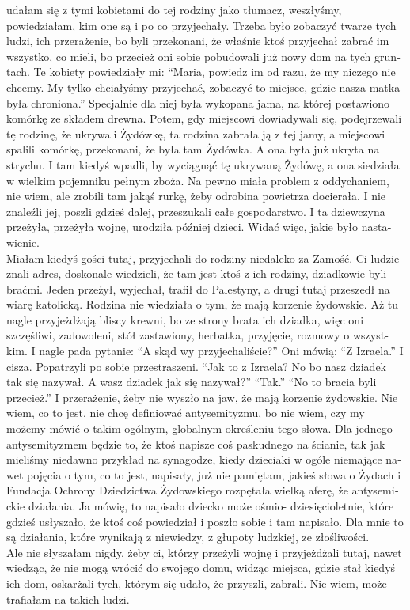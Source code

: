\begin{otherlanguage}{ngerman}
udałam się z tymi kobietami do tej rodziny jako tłumacz, weszłyśmy, powiedziałam, kim one są i po co przyjechały. Trzeba było zobaczyć twarze tych ludzi, ich przerażenie, bo byli przekonani, że właśnie ktoś przyjechał zabrać im wszystko, co mieli, bo przecież oni sobie pobudowali już nowy dom na tych gruntach. Te kobiety powiedziały mi: "`Maria, powiedz im od razu, że my niczego nie chcemy. My tylko chciałyśmy przyjechać, zobaczyć to miejsce, gdzie nasza matka była chroniona."' Specjalnie dla niej była wykopana jama, na której postawiono komórkę ze składem drewna. Potem, gdy miejscowi dowiadywali się, podejrzewali tę rodzinę, że ukrywali Żydówkę, ta rodzina zabrała ją z tej jamy, a miejscowi spalili komórkę, przekonani, że była tam Żydówka. A ona była już ukryta na strychu. I tam kiedyś wpadli, by wyciągnąć tę ukrywaną Żydówę, a ona siedziała w wielkim pojemniku pełnym zboża. Na pewno miała problem z oddychaniem, nie wiem, ale zrobili tam jakąś rurkę, żeby odrobina powietrza docierała. I nie znaleźli jej, poszli gdzieś dalej, przeszukali całe gospodarstwo. I ta dziewczyna przeżyła, przeżyła wojnę, urodziła później dzieci. Widać więc, jakie było nastawienie.\\
Miałam kiedyś gości tutaj, przyjechali do rodziny niedaleko za Zamość. Ci ludzie znali adres, doskonale wiedzieli, że tam jest ktoś z ich rodziny, dziadkowie byli braćmi. Jeden przeżył, wyjechał, trafił do Palestyny, a drugi tutaj przeszedł na wiarę katolicką. Rodzina nie wiedziała o tym, że mają korzenie żydowskie. Aż tu nagle przyjeżdżają bliscy krewni, bo ze strony brata ich dziadka, więc oni szczęśliwi, zadowoleni, stół zastawiony, herbatka, przyjęcie, rozmowy o wszystkim. I nagle pada pytanie: "`A skąd wy przyjechaliście?"' Oni mówią: "`Z Izraela."' I cisza. Popatrzyli po sobie przestraszeni. "`Jak to z Izraela? No bo nasz dziadek tak się nazywał. A wasz dziadek jak się nazywał?"' "`Tak."' "`No to bracia byli przecież."' I przerażenie, żeby nie wyszło na jaw, że mają korzenie żydowskie. Nie wiem, co to jest, nie chcę definiować antysemityzmu, bo nie wiem, czy my możemy mówić o takim ogólnym, globalnym określeniu tego słowa. Dla jednego antysemityzmem będzie to, że ktoś napisze coś paskudnego na ścianie, tak jak mieliśmy niedawno przykład na synagodze, kiedy dzieciaki w ogóle niemające nawet pojęcia o tym, co to jest, napisały, już nie pamiętam, jakieś słowa o Żydach i Fundacja Ochrony Dziedzictwa Żydowskiego rozpętała wielką aferę, że antysemickie działania. Ja mówię, to napisało dziecko może ośmio- dziesięcioletnie, które gdzieś usłyszało, że ktoś coś powiedział i poszło sobie i tam napisało. Dla mnie to są działania, które wynikają z niewiedzy, z głupoty ludzkiej, ze złośliwości.\\
Ale nie słyszałam nigdy, żeby ci, którzy przeżyli wojnę i przyjeżdżali tutaj, nawet wiedząc, że nie mogą wrócić do swojego domu, widząc miejsca, gdzie stał kiedyś ich dom, oskarżali tych, którym się udało, że przyszli, zabrali. Nie wiem, może trafiałam na takich ludzi.


\end{otherlanguage}
